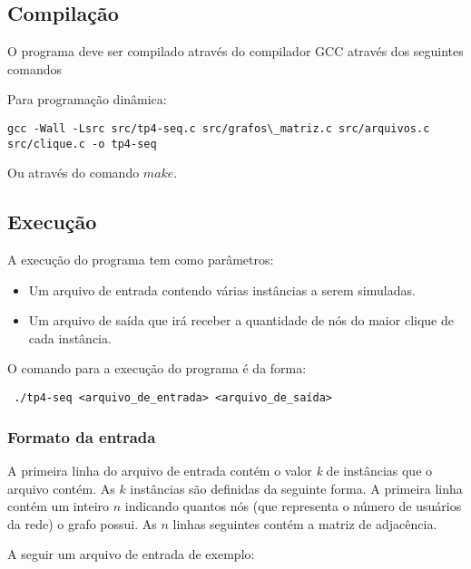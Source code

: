 \documentclass[12pt]{article}
\begin{document}
\subsection{Compilação}

O programa deve ser compilado através do compilador GCC através dos seguintes comandos

Para programação dinâmica:
\begin{footnotesize}
\begin{verbatim}
gcc -Wall -Lsrc src/tp4-seq.c src/grafos\_matriz.c src/arquivos.c src/clique.c -o tp4-seq \end{verbatim}
\end{footnotesize}

Ou através do comando $make$.

\subsection{Execução}

A execução do programa tem como parâmetros:
\begin{itemize}
\item Um arquivo de entrada contendo várias instâncias a serem simuladas.
\item Um arquivo de saída que irá receber a quantidade de nós do maior clique de cada instância.
\end{itemize}

O comando para a execução do programa é da forma:

\begin{footnotesize}
\begin{verbatim} ./tp4-seq <arquivo_de_entrada> <arquivo_de_saída>\end{verbatim}
\end{footnotesize}


\subsubsection{Formato da entrada}
\label{entrada}

A primeira linha do arquivo de entrada contém o valor \textit{k} de instâncias que o arquivo contém. As $k$ instâncias são definidas da seguinte forma. A primeira linha contém um inteiro $n$ indicando quantos nós (que representa o número de usuários da rede) o grafo possui. As $n$ linhas seguintes contém a matriz de adjacência.

A seguir um arquivo de entrada de exemplo:
\end{document}
